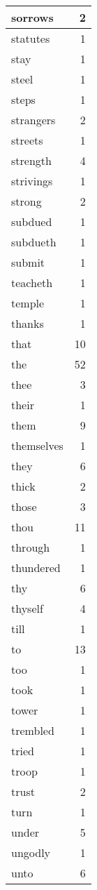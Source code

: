 \begin{center}
\begin{longtable}{l|r}
sorrows & 2 \\ \hline
statutes & 1 \\ \hline
stay & 1 \\ \hline
steel & 1 \\ \hline
steps & 1 \\ \hline
strangers & 2 \\ \hline
streets & 1 \\ \hline
strength & 4 \\ \hline
strivings & 1 \\ \hline
strong & 2 \\ \hline
subdued & 1 \\ \hline
subdueth & 1 \\ \hline
submit & 1 \\ \hline
teacheth & 1 \\ \hline
temple & 1 \\ \hline
thanks & 1 \\ \hline
that & 10 \\ \hline
the & 52 \\ \hline
thee & 3 \\ \hline
their & 1 \\ \hline
them & 9 \\ \hline
themselves & 1 \\ \hline
they & 6 \\ \hline
thick & 2 \\ \hline
those & 3 \\ \hline
thou & 11 \\ \hline
through & 1 \\ \hline
thundered & 1 \\ \hline
thy & 6 \\ \hline
thyself & 4 \\ \hline
till & 1 \\ \hline
to & 13 \\ \hline
too & 1 \\ \hline
took & 1 \\ \hline
tower & 1 \\ \hline
trembled & 1 \\ \hline
tried & 1 \\ \hline
troop & 1 \\ \hline
trust & 2 \\ \hline
turn & 1 \\ \hline
under & 5 \\ \hline
ungodly & 1 \\ \hline
unto & 6 \\ \hline

\end{longtable}
\end{center}
